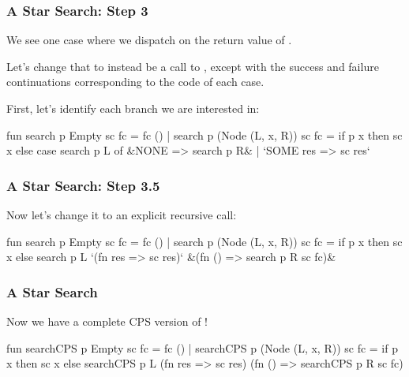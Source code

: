 \documentclass[aspectratio=169]{beamer}
\begin{document}
\begin{frame}[fragile]
  \frametitle{A Star Search: Step 3}

  We see one case where we dispatch on the return value of .

  \pause
  \vspace{\fill}

  Let's change that to instead be a call to , except with the
  success and failure continuations corresponding to the code of each case.

  \pause
  \vspace{\fill}

  First, let's identify each branch we are interested in:

  \begin{codeblock}
    fun search p Empty sc fc = fc ()
      | search p (Node (L, x, R)) sc fc =
          if p x then
            sc x
          else
            case search p L of
              &NONE => search p R&
            | `SOME res => sc res`
  \end{codeblock}
\end{frame}

\begin{frame}[fragile]
  \frametitle{A Star Search: Step 3.5}

  Now let's change it to an explicit recursive call:

  \begin{codeblock}
    fun search p Empty sc fc = fc ()
      | search p (Node (L, x, R)) sc fc =
          if p x then
            sc x
          else
            search p L
              `(fn res => sc res)`
              &(fn () => search p R sc fc)&
  \end{codeblock}
\end{frame}

\begin{frame}[fragile]
  \frametitle{A Star Search}

  Now we have a complete CPS version of !

  \begin{codeblock}
    fun searchCPS p Empty sc fc = fc ()
      | searchCPS p (Node (L, x, R)) sc fc =
          if p x then
            sc x
          else
            searchCPS p L
              (fn res => sc res)
              (fn () => searchCPS p R sc fc)
  \end{codeblock}
\end{frame}
\end{document}
